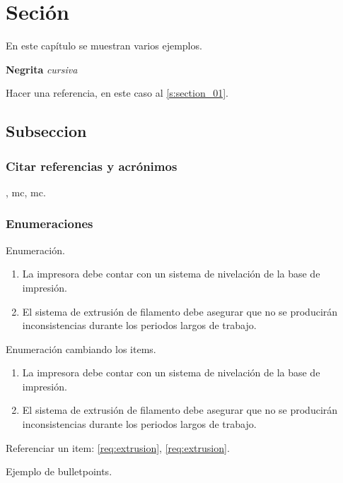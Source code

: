 \section{Seción} \label{s:section_01}

En este capítulo se muestran varios ejemplos.

\textbf{Negrita} \textit{cursiva}

Hacer una referencia, en este caso al \autoref{s:section_01}.



\subsection{Subseccion}

\subsubsection{Citar referencias y acrónimos}

\cite{im78552}, \acrshort{mc}, \acrfull{mc}.

\subsubsection{Enumeraciones}

Enumeración.

\begin{enumerate}
	\item La impresora debe contar con un sistema de nivelación de la base de impresión.
	\item El sistema de extrusión de filamento debe asegurar que no se producirán inconsistencias durante los periodos largos de trabajo.
\end{enumerate}

Enumeración cambiando los items.

\begin{enumerate}[label= \textbf{R-\arabic*}]
	\item La impresora debe contar con un sistema de nivelación de la base de impresión.
	\item El sistema de extrusión de filamento debe asegurar que no se producirán inconsistencias durante los periodos largos de trabajo. \label{req:extrusion}
\end{enumerate}

Referenciar un item: \ref{req:extrusion}, \autoref{req:extrusion}.


Ejemplo de bulletpoints.


